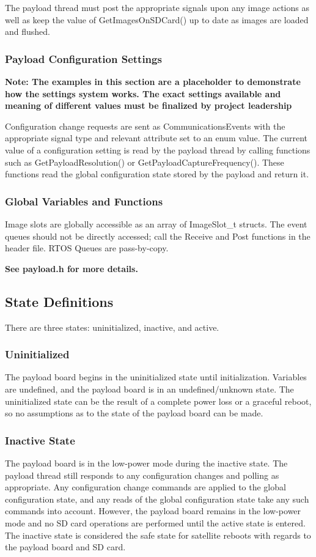 \documentclass{article}
\begin{document}
The payload thread must post the appropriate signals upon any image actions
as well as keep the value of GetImagesOnSDCard() up to date as images are
loaded and flushed.

\subsubsection{Payload Configuration Settings}
{\bfseries Note: The examples in this section are a placeholder to demonstrate
how the settings system works. The exact settings available and meaning of
different values must be finalized by project leadership}

Configuration change requests are sent as CommunicationsEvents with the 
appropriate signal type and relevant attribute set to an enum value. The 
current value of a configuration setting is read by the payload thread by
calling functions such as GetPayloadResolution() or GetPayloadCaptureFrequency().
These functions read the global configuration state stored by the payload
and return it.

\subsubsection{Global Variables and Functions}
Image slots are globally accessible as an array of ImageSlot\_t structs. The
event queues should not be directly accessed; call the Receive and Post
functions in the header file. RTOS Queues are pass-by-copy.

{\bfseries See payload.h for more details.}

\subsection{State Definitions}
There are three states: uninitialized, inactive, and active.

\subsubsection{Uninitialized}
The payload board begins in the uninitialized state until initialization.
Variables are undefined, and the payload board is in an undefined/unknown state.
The uninitialized state can be the result of a complete power loss or a graceful
reboot, so no assumptions as to the state of the payload board can be made.

\subsubsection{Inactive State}
The payload board is in the low-power mode during the inactive state. The
payload thread still responds to any configuration changes and polling as
appropriate. Any configuration change commands are applied to the global
configuration state, and any reads of the global configuration state take any
such
commands into account. However, the payload board remains in the low-power mode
and no SD card operations are performed until the active state is entered. The
inactive state is considered the safe state for satellite reboots with regards
to the payload board and SD card.
\end{document}
